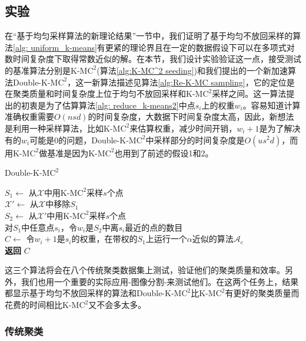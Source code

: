 \subsection{实验}
在“基于均匀采样算法的新理论结果”一节中，我们证明了基于均匀不放回采样的算法\ref{alg: uniform_k-means}有更紧的理论界且在一定的数据假设下可以在多项式对数时间复杂度下取得常数近似的解。在本节，我们设计实验验证这一点，接受测试的基准算法分别是K-M$\text{C}^2$(算法\ref{alg:K-MC^2 seeding})和我们提出的一个新加速算法Double-K-M$\text{C}^2$，这一新算法描述见算法\ref{alg:Re-K-MC sampling}，它的定位是在聚类质量和时间复杂度上位于均匀不放回采样和K-M$\text{C}^2$采样之间。这一算法提出的初衷是为了估算算法\ref{alg: reduce_k-means2}中点$s_i$上的权重$w_i$。容易知道计算准确权重需要$O(nsd)$的时间复杂度，大数据下时间复杂度太高，因此，新想法是利用一种采样算法，比如K-M$\text{C}^2$来估算权重，减少时间开销，$w_i + 1$是为了解决有的$w_i$可能是0的问题，Double-K-M$\text{C}^2$中采样部分的时间复杂度是$O(us^2 d)$，而用K-M$\text{C}^2$做基准是因为K-M$\text{C}^2$也用到了前述的假设1和2。
\begin{algorithm}
    \caption{Double-K-M$\text{C}^2$}\label{alg:Re-K-MC sampling}
    $S_1 \gets$ 从$\mathcal{X}$中用K-M$\text{C}^2$采样$s$个点 \\
    $\mathcal{X}' \gets $ 从$\mathcal{X}$中移除$S_1$ \\
    $S_2 \gets$ 从$\mathcal{X}'$中用K-M$\text{C}^2$采样$s$个点 \\
    对$S_1$中任意点$s_i$，令$w_i$是$S_2$中离$s_i$最近的点的数目 \\
    $C \gets$ 令$w_i + 1$是$s_i$的权重，在带权的$S_1$上运行一个$\alpha$近似的算法$\mathcal{A}_c$ \\
    \textbf{返回} $C$
\end{algorithm}
这三个算法将会在八个传统聚类数据集上测试，验证他们的聚类质量和效率。另外，我们也用一个重要的实际应用-图像分割-来测试他们。在这两个任务上，结果都显示基于均匀不放回采样的算法和Double-K-M$\text{C}^2$比K-M$\text{C}^2$有更好的聚类质量而花费的时间相比K-M$\text{C}^2$又不会多太多。

\subsubsection{传统聚类}

